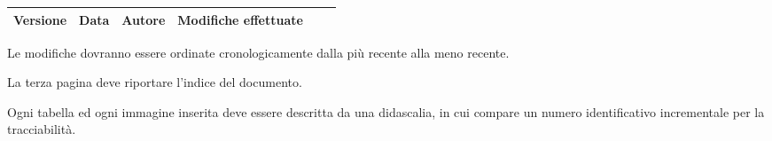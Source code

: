 \begin{center}
\begin{longtable}{|c|c|c|p{0.5\linewidth}|}
\toprule
\textbf{Versione} & \textbf{Data} & \textbf{Autore} & \textbf{Modifiche effettuate}\\

\bottomrule
\end{longtable}
\end{center}
Le modifiche dovranno essere ordinate cronologicamente dalla più recente alla meno recente.



La terza pagina deve riportare l'indice del documento.


Ogni tabella ed ogni immagine inserita deve essere descritta da una didascalia, in cui compare un numero identificativo incrementale per la tracciabilità.

